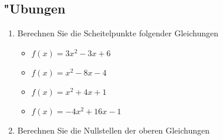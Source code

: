 \subsection{"Ubungen}
\begin{enumerate}
\item Berechnen Sie die Scheitelpunkte folgender Gleichungen
\begin{itemize}
\item $f(x) = 3x^2 - 3x + 6$
\item $f(x) = x^2 - 8x - 4$
\item $f(x) = x^2 + 4x + 1$
\item $f(x) = -4x^2 + 16x - 1$
\end{itemize}
\item Berechnen Sie die Nullstellen der oberen Gleichungen
\end{enumerate}